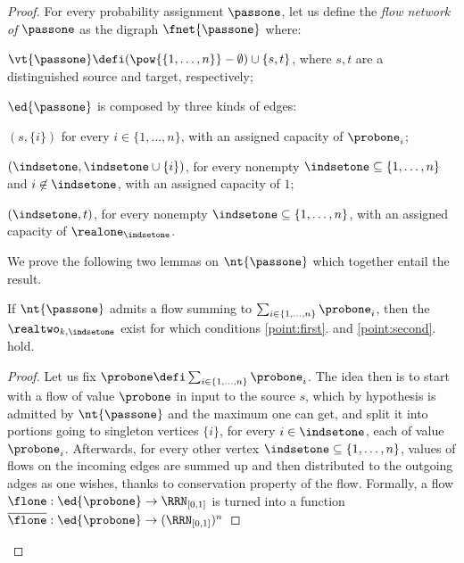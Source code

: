\begin{proof}
  For every probability assignment $\passone$, let us define the \emph{flow
    network of $\passone$} as the digraph $\fnet{\passone}$ where:
  \begin{varitemize}
  \item 
    $\vt{\passone}\defi(\pow{\{1,\dots,n\}}-\emptyset)\cup\{s,t\}$, where $s,t$ are a
    distinguished source and target, respectively;
  \item 
    $\ed{\passone}$ is composed by three kinds of edges:
    \begin{varitemize}
    \item $(s,\{i\})$ for every $i\in\{1,\dots,n\}$, with an assigned
      capacity of $\probone_i$;
    \item $(\indsetone,\indsetone\cup\{i\})$, for every nonempty
      $\indsetone\subseteq\{1,\dots,n\}$ and $i\not\in\indsetone$, with an
      assigned capacity of $1$;
    \item $(\indsetone,t)$, for every nonempty
      $\indsetone\subseteq\{1,\dots,n\}$, with an assigned capacity of
      $\realone_\indsetone$.
    \end{varitemize}
  \end{varitemize}
  We prove the following two lemmas on $\nt{\passone}$ which
  together entail the result.
  \begin{varitemize}
  \item
    \begin{lemma}
      If $\nt{\passone}$ admits a flow summing to
      $\sum_{i\in\{1,\dots,n\}}\probone_i$, then the $\realtwo_{k,\indsetone}$
      exist for which conditions \ref{point:first}. and
      \ref{point:second}. hold.
    \end{lemma}
    \begin{proof}
      Let us fix $\probone\defi\sum_{i\in\{1,\dots,n\}}\probone_i$. The idea
      then is to start with a flow of value $\probone$ in input to the source
      $s$, which by hypothesis is admitted by $\nt{\passone}$ and the maximum
      one can get, and split it into portions going to singleton vertices
      $\{i\}$, for every $i\in\indsetone$, each of value
      $\probone_i$. Afterwards, for every other vertex
      $\indsetone\subseteq\{1,\dots,n\}$, values of flows on the incoming
      edges are summed up and then distributed to the outgoing adges as one
      wishes, thanks to conservation property of the flow. Formally, a flow
      ${\flone}:\ed{\probone}\rightarrow\RRN_{[0,1]}$ is turned into a
      function $\overline{\flone}:\ed{\probone}\rightarrow(\RRN_{[0,1]})^n$

\end{proof}
\end{varitemize}
\end{proof}
